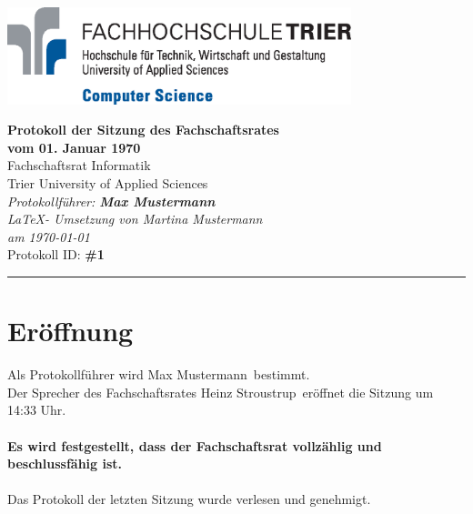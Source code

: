 \documentclass[a4paper, 11pt]{article} %
\newcommand{\protokoller}{Max Mustermann}
\newcommand{\dateOfMeeting}{01. Januar 1970}
\newcommand{\TeXer}{Martina Mustermann}
\newcommand{\fsiPresident}{Heinz Stroustrup}
\newcommand{\protocolID}{1}
\begin{document}

\doublespacing
\thispagestyle{empty}

\begin{center}
\includegraphics[width=10.0cm]{../logo_faculty_computer_science.eps}

\vspace*{\fill}
{\LARGE \textbf{Protokoll der Sitzung des Fachschaftsrates \\vom \dateOfMeeting}}\\
Fachschaftsrat Informatik\\
Trier University of Applied Sciences\\
\vspace{2.5cm}
\textit{
	Protokollführer: \textbf{\protokoller} \\
	\LaTeX - Umsetzung von \TeXer\\
	am \today\\
}
Protokoll ID: \textbf{\#\protocolID}
\vfill
\end{center}

\hspace*{-35cm}
\textcolor{fsi}{\rule{64.9cm}{15pt}}
\pagebreak
 
\setcounter{tocdepth}{2}
\tableofcontents 
\pagebreak

\section{Eröffnung}
Als Protokollführer wird \protokoller~bestimmt.\\
Der Sprecher des Fachschaftsrates \fsiPresident~eröffnet die Sitzung um 14:33 Uhr.
\\\\
\textbf{Es wird festgestellt, dass der Fachschaftsrat vollzählig und beschlussfähig ist.}
\\\\
Das Protokoll der letzten Sitzung wurde verlesen und genehmigt.
\end{document}
